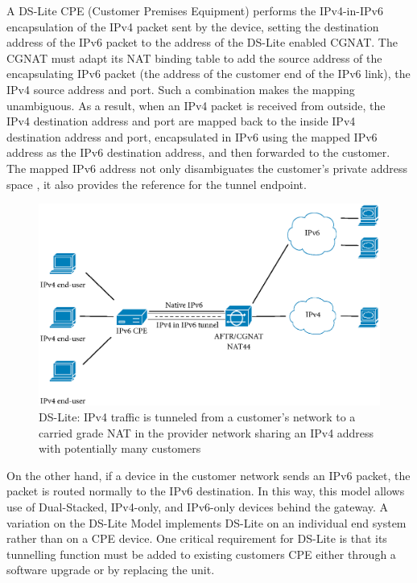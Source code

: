 \documentclass{llncs}
\begin{document}
A DS-Lite CPE (Customer Premises Equipment) performs the IPv4-in-IPv6 encapsulation of the IPv4 packet sent by the device, setting the destination address of the IPv6 packet to the address of the DS-Lite enabled CGNAT. The CGNAT must adapt its NAT binding table to add the source address of the encapsulating IPv6 packet (the address of the customer end of the IPv6 link), the IPv4 source address and port. Such a combination makes the mapping unambiguous. As a result, when an IPv4 packet is received from outside, the IPv4 destination address and port are mapped back to the inside IPv4 destination address and port, encapsulated in IPv6 using the mapped IPv6 address as the IPv6 destination address, and then forwarded to the customer. The mapped IPv6 address not only disambiguates the customer's private address space \cite{RFC1918}, it also provides the reference for the tunnel endpoint.
\begin{figure}[t]
\centering
\includegraphics*[width=0.85\linewidth]{dslite2} 
\caption{DS-Lite: IPv4 traffic is tunneled from a customer's network   to a carried grade NAT in the provider network sharing an IPv4 address with potentially many customers}
\label{fig:MultipleDeviceDSLite}
\end{figure}
On the other hand, if a device in the customer network sends an IPv6 packet, the packet is routed normally to the IPv6 destination. In this way, this model allows use of Dual-Stacked, IPv4-only, and IPv6-only devices behind the gateway. A variation on the DS-Lite Model implements DS-Lite on an individual end system rather than on a CPE device. One critical requirement for DS-Lite is that its tunnelling function must be added to existing customers CPE either through a software upgrade or by replacing the unit.
\end{document}
